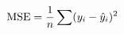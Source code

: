 \documentclass[preview]{standalone}
\begin{document}
\begin{align*}
\special{dvisvgm:raw <g id='unique000'>}\text{MSE} = \frac{1}{n} \sum (y_i - \hat{y}_i)^2\special{dvisvgm:raw </g>}
\end{align*}
\end{document}
